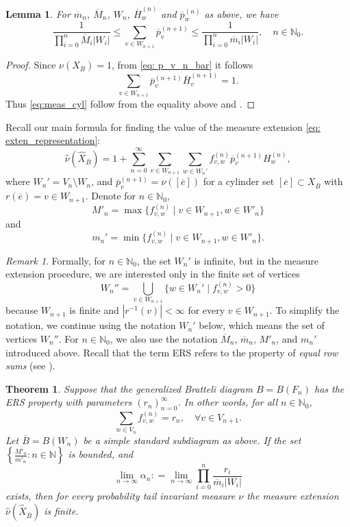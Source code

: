 \documentclass[11pt,reqno]{amsart}
\theoremstyle{definition}
\theoremstyle{remark}
\newtheorem{remark}[definition]{Remark}
\theoremstyle{plain}
\newtheorem{theorem}[definition]{Theorem}
\newtheorem{lemma}[definition]{Lemma}
\def\ol{\overline}
\def\ov{\overline}
\def\wh{\widehat}
\newcommand{\N}{\mathbb N}
\newcommand{\be}{\begin{equation}}
\newcommand{\ee}{\end{equation}}
\numberwithin{equation}{section}
\begin{document}
\begin{lemma}\label{claim:bd_meas_cyl}
For $\ov m_n$, $\ov M_n$, $W_n$, $\ov H_w^{(n)}$ and $\ov p_w^{(n)}$ as above, we have  
    \begin{equation}\label{eq:meas_cyl}
    \frac{1}{\prod_{i = 0}^n\ov M_i|W_i|} \leq \sum_{v \in W_{n+1}}\ov p_v^{(n+1)} \leq \frac{1}{\prod_{i = 0}^n\ov m_i|W_i|}, \quad n\in \N_0.
\end{equation}
    \end{lemma}

\begin{proof} Since $\nu(X_{\ov B}) = 1$, from \eqref{eq: p_v_n_bar} it follows
$$
\sum_{v \in W_{n+1}} \ov p_v^{(n+1)} \ov H_v^{(n+1)} = 1.
$$ Thus \eqref{eq:meas_cyl} follow from the equality above and .
\end{proof}
Recall our main formula for finding the value of the measure extension \eqref{eq: exten_representation}: 
\begin{equation}\label{eq:meas_ext}
    \wh \nu(\wh X_{\ov B}) = 1 + \sum_{n = 0}^{\infty} \sum_{v \in W_{n+1}}\sum_{w \in W_n'} f_{v,w}^{(n)} \ov p_v^{(n+1)}H_w^{(n)},
\end{equation}
where $W_n' = V_n \setminus W_n$, and $\ov p_v^{(n+1)} = \nu([\ov e])$ for a cylinder set $[\ov e] \subset X_{\ov B}$ with $r(\ov e) = v \in W_{n+1}$.
Denote for $n \in \N_0$,
\be\label{eq s4 M'_n}
M'_n = \max\{f_{v,w}^{(n)} \;| \; v \in W_{n+1}, w \in W'_n\}
\ee
and 
\be\label{eq s4 m'_n}
m_n' = \min\{f_{v,w}^{(n)} \; |\;  v \in W_{n+1}, w \in W'_n\}.
\ee

\begin{remark}
Formally, for $n \in \N_0$, the set $W_n'$ is infinite, but in the measure extension procedure, we are interested only in the finite set of vertices 
$$
W_n'' = \bigcup_{v \in W_{n+1}}\{w \in W_n' \; | \;f_{v,w}^{(n)} > 0\}
$$ 
because $W_{n+1}$ is finite and $|r^{-1}(v)| < \infty$ for every $v \in W_{n+1}$. To simplify the notation, we continue using the notation $W_n'$ below, which means the set of vertices $W_n''$. For $n \in \N_0$, we also use the notation $\ol M_n$, $\ol m_n$, $M'_n$, and $m_n'$ introduced above. Recall that the term ERS refers to the property of \textit{equal row sums} (see ).
\end{remark}


\begin{theorem}\label{thm meas ext finite sbdgrm}
Suppose that the generalized Bratteli diagram $B= B(F_n)$ has the ERS property with parameters $(r_n)_{n=0}^{\infty}$. In other words, for all $n \in \N_0$,
\[\sum_{w \in V_n} f_{v,w}^{(n)} = r_n, \quad \forall v \in V_{n+1}.\]
Let $\ol B = B(W_n)$ be a simple standard subdiagram as above. If the set $\left\{\frac{M'_n}{m'_n} : n \in \N\right\}$ is bounded, and 
$$
\lim_{n\to\infty}\alpha_n : = \lim_{n\to\infty} \prod_{i = 0}^n \frac{r_i}
{\ov m_i |W_i|}
$$
exists, then for every probability tail invariant measure  $\nu $ the 
measure extension $\wh \nu(\wh X_{\ol B})$ is finite.
\end{theorem}
\end{document}
